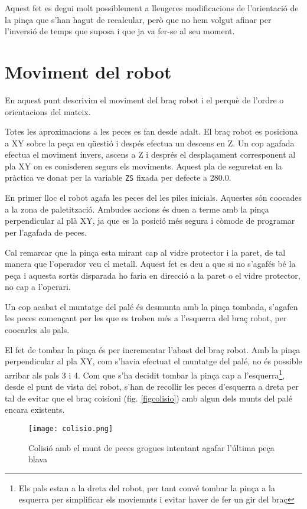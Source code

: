 Aquest fet es degui molt possiblement a lleugeres modificacions de l'orientació de la pinça
que s'han hagut de recalcular, però que no hem volgut afinar per l'inversió de temps
que suposa i que ja va fer-se al seu moment.

\section{Moviment del robot}
En aquest punt descrivim el moviment del braç robot i el perquè de l'ordre o
orientacions del mateix.

Totes les aproximacions a les peces es fan desde adalt. El braç robot es
posiciona a XY sobre la peça en qüestió i despés efectua un descens en Z. Un
cop agafada efectua el moviment invers, ascens a Z i després el desplaçament
corresponent al pla XY on es conisderen segurs els moviments. Aquest pla de
seguretat en la pràctica ve donat per la variable \texttt{ZS} fixada per
defecte a 280.0.

En primer lloc el robot agafa les peces del les piles inicials.
Aquestes són co\lgem ocades a la zona de paletització. Ambudes
accions és duen a terme amb la pinça perpendicular al plà XY, ja que es la
posició més segura i còmode de programar per l'agafada de peces.

Cal remarcar que la pinça esta mirant cap al vidre protector i la paret,
de tal manera que l'operador veu el metall. Aquest fet es deu a que
si no s'agafés bé la peça i aquesta sortis disparada ho faria en
direcció a la paret o el vidre protector, no cap a l'operari.

Un cop acabat el muntatge del palé és desmunta amb la pinça tombada,
s'agafen les peces començant per les que es
troben més a l'esquerra del braç robot, per co\lgem ocarles als pals.

El fet de tombar la pinça és per incrementar l'abast del braç robot. Amb la
pinça perpendicular al pla XY, com s'havia efectuat el muntatge del palé, no
és possible arribar als pals 3 i 4. Com que s'ha decidit tombar la pinça
cap a l'esquerra\footnote{Els pals estan a la dreta del robot, per tant convé
tombar la pinça a la esquerra per simplificar els moviemnts i evitar haver
de fer un gir del braç}, desde el punt de vista del robot, s'han de recollir
les peces d'esquerra a dreta per tal de evitar que el braç co\lgem isioni
(fig. \ref{figcolisio}) amb algun dels munts del palé encara existents.

\begin{figure}[H]
\begin{center}
 \texttt{[image: colisio.png]}
\end{center}
  \caption{Colisió amb el munt de peces grogues intentant agafar l'última peça blava}
\end{figure}\label{figcolisio}

